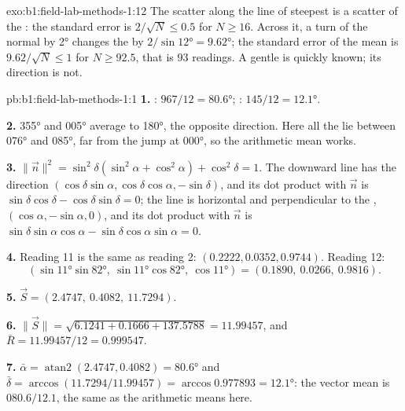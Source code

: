 \begin{solution}{exo:b1:field-lab-methods-1:12}
The scatter along the line of steepest  is a scatter of the : the
standard error is $2/\sqrt N \le 0.5$ for $N \ge 16$. Across it, a turn of the
normal by \ang{2} changes the  by $2/\sin\ang{12} = \ang{9.62}$;
the standard error of the mean  is $9.62/\sqrt N \le 1$ for
$N \ge 92.5$, that is 93 readings. A gentle  is quickly known; its
direction is not.
\end{solution}

\begin{solution}{pb:b1:field-lab-methods-1:1}
\textbf{1.} : $967/12 = \ang{80.6}$; : $145/12 =
\ang{12.1}$.

\textbf{2.} \ang{355} and \ang{005} average to \ang{180}, the opposite
direction. Here all the  lie between \ang{076} and \ang{085},
far from the jump at \ang{000}, so the arithmetic mean works.

\textbf{3.} $\|\vec n\|^2 = \sin^2\delta(\sin^2\alpha + \cos^2\alpha) +
\cos^2\delta = 1$. The downward  line has the direction
$(\cos\delta\sin\alpha, \cos\delta\cos\alpha, -\sin\delta)$, and its dot
product with $\vec n$ is $\sin\delta\cos\delta - \cos\delta\sin\delta = 0$; the
 line is horizontal and perpendicular to the ,
$(\cos\alpha, -\sin\alpha, 0)$, and its dot product with $\vec n$ is
$\sin\delta\sin\alpha\cos\alpha - \sin\delta\cos\alpha\sin\alpha = 0$.

\textbf{4.} Reading 11 is the same as reading 2: $(0.2222, 0.0352, 0.9744)$.
Reading 12:
\[
  (\sin\ang{11}\sin\ang{82},\ \sin\ang{11}\cos\ang{82},\ \cos\ang{11}) =
  (0.1890,\ 0.0266,\ 0.9816).
\]

\textbf{5.} $\vec S = (2.4747,\ 0.4082,\ 11.7294)$.

\textbf{6.} $\|\vec S\| = \sqrt{6.1241 + 0.1666 + 137.5788} = 11.99457$, and
$\bar R = 11.99457/12 = 0.999547$.

\textbf{7.} $\bar\alpha = \operatorname{atan2}(2.4747, 0.4082) = \ang{80.6}$
and $\bar\delta = \arccos(11.7294/11.99457) = \arccos 0.977893 = \ang{12.1}$:
the vector mean is $080.6/12.1$, the same as the arithmetic means here.


\end{solution}

